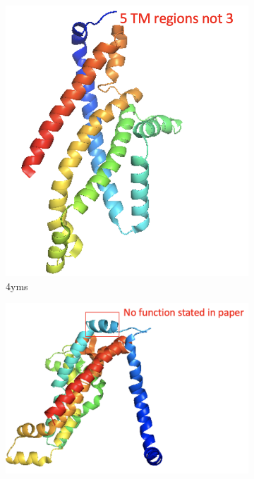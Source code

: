  
\begin{figure}[htb]
\begin{subfigure}{0.25\textwidth}
  \includegraphics[width=\linewidth]{introduction/4yms.png}
  \caption{4yms}
  \label{fig:4yms}
\end{subfigure}\hfil %
\begin{subfigure}{0.25\textwidth}
  \includegraphics[width=\linewidth]{introduction/4tqu.png}

\end{subfigure}
\end{figure}
